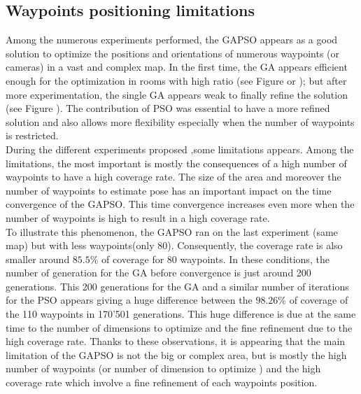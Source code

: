 	\subsection{Waypoints positioning limitations} \label{sec:waypointPoseLimite}
	
Among the numerous experiments performed, the GAPSO appears as a good solution to optimize the positions and orientations of numerous waypoints (or cameras) in a vast and complex map.
In the first time, the GA appears efficient enough for the optimization in rooms with high ratio (see Figure  or ); but after more experimentation, the single GA appears weak to finally refine the solution (see Figure ). The contribution of PSO was essential to have a more refined solution and also allows more flexibility especially when the number of waypoints is restricted. \\
During the different experiments proposed ,some limitations appears. Among the limitations, the most important is mostly the consequences of a high number of waypoints to have a high coverage rate.
 The size of the area and moreover the number of waypoints to estimate pose has an important impact on the time convergence of the GAPSO.  This time convergence increases even more when the number of waypoints is high to result in a high coverage rate. \\
 To illustrate this phenomenon, the GAPSO ran on the last experiment (same map) but  with less waypoints(only 80). Consequently, the coverage rate is also smaller around $85.5\%$ of coverage for 80 waypoints. In these conditions, the number of generation for the GA before convergence is just around 200 generations.  This 200 generations for the GA and a similar number of iterations for the PSO appears giving a huge difference between the $98.26\%$ of coverage of the 110 waypoints in 170'501 generations. This huge difference is due at the same time to the number of dimensions to optimize and the fine refinement due to the high coverage rate.
 Thanks to these observations, it is appearing that the main limitation of the GAPSO is not the  big or complex area, but is mostly the high number of waypoints (or number of dimension to optimize ) and the high coverage rate which involve a fine refinement of each waypoints position. 
 



